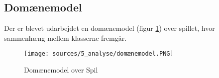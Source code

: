 \subsection{Domænemodel}

Der er blevet udarbejdet en domænemodel (figur \ref{fig:domænemodel}) over spillet, hvor sammenhæng mellem klasserne fremgår.

\begin{figure}[H]
    \centering
    \texttt{[image: sources/5\_analyse/domænemodel.PNG]}
    \caption{Domænemodel over Spil}
    \label{fig:domænemodel}
\end{figure}



